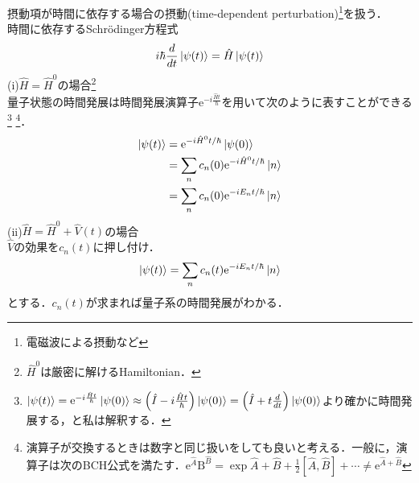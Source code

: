 \documentclass{standalone}
\begin{document}
  摂動項が時間に依存する場合の摂動(time-dependent perturbation)\footnote{電磁波による摂動など}を扱う．\\
  時間に依存するSchrödinger方程式
  \begin{equation}
  i\hbar\frac{d}{dt}\ket{\psi(t)}=\hat{H}\ket{\psi(t)}
  \end{equation}
  (i)$\hat{H}=\hat{H}^0$の場合\footnote{$\hat{H}^0$は厳密に解けるHamiltonian．}\\
  量子状態の時間発展は時間発展演算子$\mathrm{e}^{-i\frac{\hat{H}t}{\hbar}}$を用いて次のように表すことができる\footnote{$\ket{\psi(t)}=\mathrm{e}^{-i\frac{\hat{H}t}{\hbar}}\ket{\psi(0)}\approx\qty(\hat{I}-i\frac{\hat{H}t}{\hbar})\ket{\psi(0)}=\qty(\hat{I}+t\frac{d}{dt})\ket{\psi(0)}$より確かに時間発展する，と私は解釈する．}
  \footnote{演算子が交換するときは数字と同じ扱いをしても良いと考える．一般に，演算子は次のBCH公式を満たす．$\mathrm{e}^{\hat{A}}\mathrm{B}^{\hat{B}}=\exp{\hat{A}+\hat{B}+\frac{1}{2}[\hat{A},\hat{B}]+\cdots}\ne\mathrm{e}^{\hat{A}+\hat{B}}$}．
  \begin{align}
    \ket{\psi(t)}&=\mathrm{e}^{-i\hat{H}^0t/\hbar}\ket{\psi(0)}\\
    &=\sum_{n}c_n(0)\mathrm{e}^{-i\hat{H}^0t/\hbar}\ket{n}\\
    &=\sum_{n}c_n(0)\mathrm{e}^{-iE_nt/\hbar}\ket{n}
  \end{align}
  (ii)$\hat{H}=\hat{H}^0+\hat{V}(t)$の場合\\
  $\hat{V}$の効果を$c_n(t)$に押し付け．
  \begin{equation}
    \ket{\psi(t)}=\sum_{n}c_n(t)\mathrm{e}^{-iE_nt/\hbar}\ket{n}
  \end{equation}
  とする．$c_n(t)$が求まれば量子系の時間発展がわかる．
\end{document}
